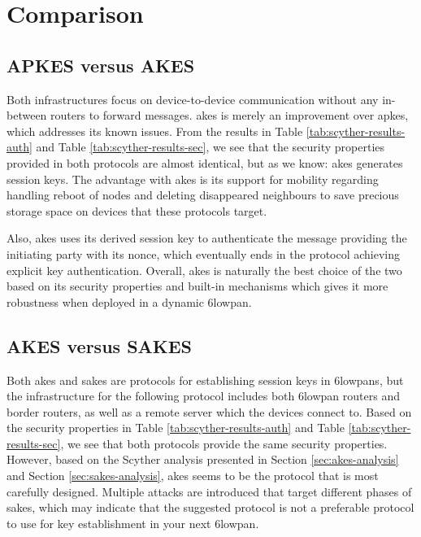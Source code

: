 \section{Comparison}

\subsection{APKES versus AKES}

Both infrastructures focus on device-to-device communication without any in-between routers to forward messages. \gls{akes} is merely an improvement over \gls{apkes}, which addresses its known issues. From the results in Table \ref{tab:scyther-results-auth} and Table \ref{tab:scyther-results-sec}, we see that the security properties provided in both protocols are almost identical, but as we know: \gls{akes} generates session keys. The advantage with \gls{akes} is its support for mobility regarding handling reboot of nodes and deleting disappeared neighbours to save precious storage space on devices that these protocols target.

Also, \gls{akes} uses its derived session key to authenticate the message providing the initiating party with its nonce, which eventually ends in the protocol achieving explicit key authentication. Overall, \gls{akes} is naturally the best choice of the two based on its security properties and built-in mechanisms which gives it more robustness when deployed in a dynamic \gls{6lowpan}.

\subsection{AKES versus SAKES}

Both \gls{akes} and \gls{sakes} are protocols for establishing session keys in \gls{6lowpan}s, but the infrastructure for the following protocol includes both \gls{6lowpan} routers and border routers, as well as a remote server which the devices connect to. Based on the security properties in Table \ref{tab:scyther-results-auth} and Table \ref{tab:scyther-results-sec}, we see that both protocols provide the same security properties. However, based on the Scyther analysis presented in Section \ref{sec:akes-analysis} and Section \ref{sec:sakes-analysis}, \gls{akes} seems to be the protocol that is most carefully designed. Multiple attacks are introduced that target different phases of \gls{sakes}, which may indicate that the suggested protocol is not a preferable protocol to use for key establishment in your next \gls{6lowpan}.

